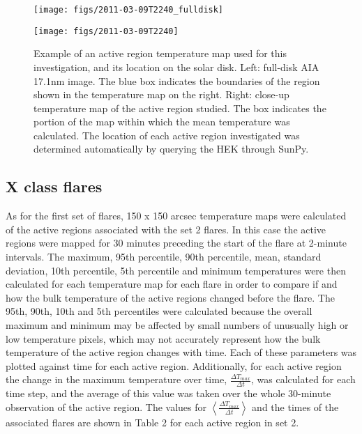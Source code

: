 \documentclass{article}
\begin{document}
\begin{figure}
\begin{centering}
\texttt{[image: figs/2011-03-09T2240\_fulldisk]}
\par\end{centering}

\begin{centering}
\texttt{[image: figs/2011-03-09T2240]}
\par\end{centering}

\caption{Example of an active region temperature map used for this investigation,
and its location on the solar disk. Left: full-disk AIA 17.1nm image.
The blue box indicates the boundaries of the region shown in the temperature
map on the right. Right: close-up temperature map of the active region
studied. The box indicates the portion of the map within which the
mean temperature was calculated. The location of each active region
investigated was determined automatically by querying the HEK through
SunPy.\label{fig:ar-demo}}
\end{figure}


\subsection{X class flares}
As for the first set of flares, 150 x 150 arcsec temperature maps
were calculated of the active regions associated with the set 2 flares.
In this case the active regions were mapped for 30 minutes preceding
the start of the flare at 2-minute intervals. The maximum, 95th percentile,
90th percentile, mean, standard deviation, 10th percentile, 5th percentile
and minimum temperatures were then calculated for each temperature
map for each flare in order to compare if and how the bulk temperature
of the active regions changed before the flare. The 95th, 90th, 10th
and 5th percentiles were calculated because the overall maximum and
minimum may be affected by small numbers of unusually high or low
temperature pixels, which may not accurately represent how the bulk
temperature of the active region changes with time. Each of these
parameters was plotted against time for each active region. Additionally,
for each active region the change in the maximum temperature over
time, $\frac{\Delta T_{max}}{\Delta t}$, was calculated for each
time step, and the average of this value was taken over the whole
30-minute observation of the active region. The values for $\left\langle \frac{\Delta T_{max}}{\Delta t}\right\rangle $
and the times of the associated flares are shown in Table 2 for each
active region in set 2.
\end{document}
